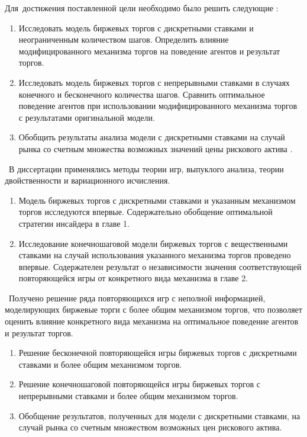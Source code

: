Для~достижения поставленной цели необходимо было решить следующие {\tasks}:
\begin{enumerate}
\item 
Исследовать модель биржевых торгов с дискретными ставками и неограниченным количеством шагов.
Определить влияние модифицированного механизма торгов на поведение агентов и результат торгов.
\item 
Исследовать модель биржевых торгов с непрерывными ставками в случаях конечного и бесконечного количества шагов.
Сравнить оптимальное поведение агентов при использовании модифицированного механизма торгов с результатами оригинальной модели.
\item 
Обобщить результаты анализа модели с дискретными ставками на случай рынка со счетным множества возможных значений цены рискового актива .
\end{enumerate}

\methods\ В диссертации применялись методы теории игр, выпуклого анализа, теории двойственности и вариационного исчисления.

\novelty
\begin{enumerate}
\item 
Модель биржевых торгов с дискретными ставками и указанным механизмом торгов исследуются впервые.
Содержательно обобщение оптимальной стратегии инсайдера в главе 1.
\item 
Исследование конечношаговой модели биржевых торгов с вещественными ставками на случай использования указанного механизма торгов проведено впервые.
Содержателен результат о независимости значения соответствующей повторяющейся игры от конкретного вида механизма в главе 2.
\end{enumerate}

\influence\ Получено решение ряда повторяющихся игр с неполной информацией, моделирующих биржевые торги с более общим механизмом торгов, что позволяет оценить влияние конкретного вида механизма на оптимальное поведение агентов и результат торгов.

\begin{enumerate}
\item
Решение бесконечной повторяющейся игры биржевых торгов с дискретными ставками и более общим механизмом торгов.
\item
Решение конечношаговой повторяющейся игры биржевых торгов с непрерывными ставками и более общим механизмом торгов.
\item
Обобщение результатов, полученных для модели с дискретными ставками, на случай рынка со счетным множеством возможных цен рискового актива.
\end{enumerate}

